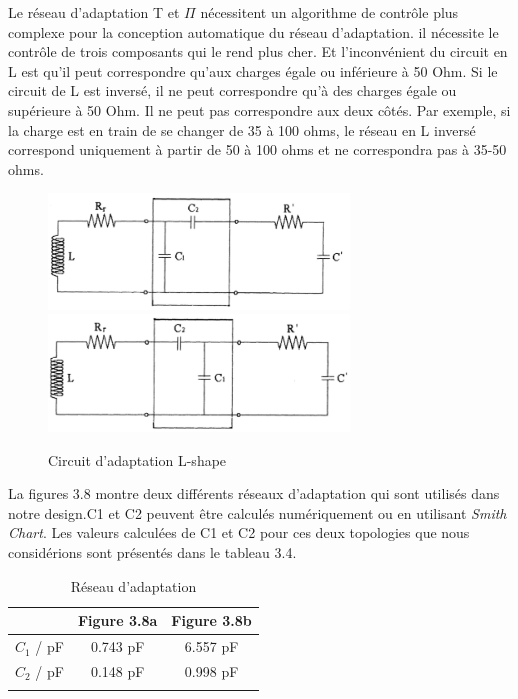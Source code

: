 \documentclass[11pt, a4paper, twoside]{book}
\begin{document}
Le réseau d'adaptation T et \(\Pi\) nécessitent un algorithme de contrôle plus complexe pour la conception automatique du réseau d'adaptation. il nécessite le contrôle de trois composants qui le rend plus cher. Et l'inconvénient du circuit en L est qu'il peut correspondre qu'aux charges égale ou inférieure à 50 Ohm. Si le circuit de L est inversé, il ne peut correspondre qu'à des charges égale ou supérieure à 50 Ohm. Il ne peut pas correspondre aux deux côtés. Par exemple, si la charge est en train de se changer de 35 à 100 ohms, le réseau en L inversé correspond uniquement à partir de 50 à 100 ohms et ne correspondra pas à 35-50 ohms.
\begin{figure}[H]
\centering
\includegraphics[width=8cm]{matcha}
\includegraphics[width=8cm]{matchb}
\caption{Circuit d'adaptation L-shape}
\end{figure}
La figures 3.8 montre deux différents réseaux d'adaptation qui sont utilisés dans notre  design.C1 et C2 peuvent être calculés numériquement ou en utilisant \emph {Smith Chart}. Les valeurs calculées de C1 et C2 pour ces deux topologies que nous considérions sont présentés dans le tableau 3.4.\\
\begin{longtable}[c]{| c | c | c |}
 \hline
  & Figure 3.8a & Figure 3.8b\\
 \hline
 \(C_{1}\) / pF & 0.743 pF & 6.557 pF\\
 \hline
 \(C_{2}\) / pF & 0.148 pF & 0.998 pF\\
 \hline
\caption{Réseau d'adaptation}
\end{longtable}
\end{document}
